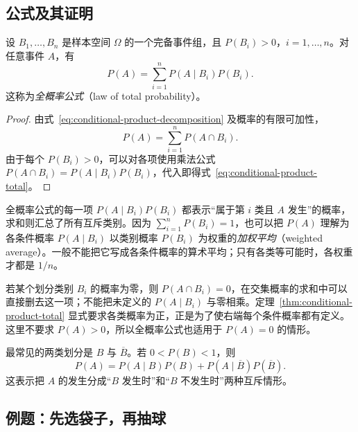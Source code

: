 \documentclass[UTF8,12pt,a4paper,fontset=fandol]{ctexart}
\begin{document}
\subsection{公式及其证明}

\begin{theorem}[全概率公式]
\label{thm:conditional-product-total}
设 $B_1,\ldots,B_n$ 是样本空间 $\Omega$ 的一个完备事件组，且 $P(B_i)>0$，$i=1,\ldots,n$。对任意事件 $A$，有
\begin{equation}
  P(A)=\sum_{i=1}^{n}P(A\mid B_i)P(B_i).
  \label{eq:conditional-product-total}
\end{equation}
这称为\emph{全概率公式}（law of total probability）。
\end{theorem}
\begin{proof}
由式~\eqref{eq:conditional-product-decomposition} 及概率的有限可加性，
\[
  P(A)=\sum_{i=1}^{n}P(A\cap B_i).
\]
由于每个 $P(B_i)>0$，可以对各项使用乘法公式 $P(A\cap B_i)=P(A\mid B_i)P(B_i)$，代入即得式~\eqref{eq:conditional-product-total}。
\end{proof}

全概率公式的每一项 $P(A\mid B_i)P(B_i)$ 都表示“属于第 $i$ 类且 $A$ 发生”的概率，求和则汇总了所有互斥类别。因为 $\sum_{i=1}^{n}P(B_i)=1$，也可以把 $P(A)$ 理解为各条件概率 $P(A\mid B_i)$ 以类别概率 $P(B_i)$ 为权重的\emph{加权平均}（weighted average）。一般不能把它写成各条件概率的算术平均；只有各类等可能时，各权重才都是 $1/n$。

若某个划分类别 $B_i$ 的概率为零，则 $P(A\cap B_i)=0$，在交集概率的求和中可以直接删去这一项；不能把未定义的 $P(A\mid B_i)$ 与零相乘。定理~\ref{thm:conditional-product-total} 显式要求各类概率为正，正是为了使右端每个条件概率都有定义。这里不要求 $P(A)>0$，所以全概率公式也适用于 $P(A)=0$ 的情形。

最常见的两类划分是 $B$ 与 $\overline B$。若 $0<P(B)<1$，则
\begin{equation}
  P(A)=P(A\mid B)P(B)
       +P(A\mid\overline B)P(\overline B).
  \label{eq:conditional-product-total-binary}
\end{equation}
这表示把 $A$ 的发生分成“$B$ 发生时”和“$B$ 不发生时”两种互斥情形。

\subsection{例题：先选袋子，再抽球}
\end{document}

